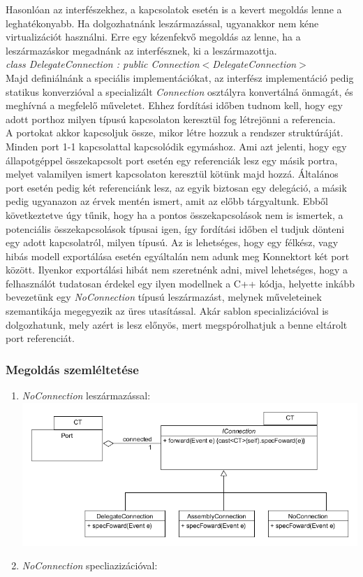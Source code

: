 \documentclass[a4paper,12pt]{report}
\begin{document}
Hasonlóan az interfészekhez, a kapcsolatok esetén is a kevert megoldás lenne a leghatékonyabb. Ha dolgozhatnánk leszármazással, ugyanakkor nem kéne virtualizációt használni. Erre egy kézenfekvő megoldás az lenne, ha a leszármazáskor megadnánk az interfésznek, ki a leszármazottja. \\
\textit{class DelegateConnection : public Connection}$<$\textit{DelegateConnection}$>$ \\
Majd definiálnánk a speciális implementációkat, az interfész implementáció pedig statikus konverzióval a specializált \textit{Connection} osztályra konvertálná önmagát, és meghívná a megfelelő műveletet. Ehhez fordítási időben tudnom kell, hogy egy adott porthoz milyen típusú kapcsolaton keresztül fog létrejönni a referencia. \\ 
A portokat akkor kapcsoljuk össze, mikor létre hozzuk a rendszer struktúráját. Minden port 1-1 kapcsolattal kapcsolódik egymáshoz. Ami azt jelenti, hogy egy állapotgéppel összekapcsolt port esetén egy referenciák lesz egy másik portra, melyet valamilyen ismert kapcsolaton keresztül kötünk majd hozzá. Általános port esetén pedig két referenciánk lesz, az egyik biztosan egy delegáció, a másik pedig ugyanazon az érvek mentén ismert, amit az előbb tárgyaltunk. Ebből következtetve úgy tűnik, hogy ha a pontos összekapcsolások nem is ismertek, a potenciális összekapcsolások típusai igen, így fordítási időben el tudjuk dönteni egy adott kapcsolatról, milyen típusú. Az is lehetséges, hogy egy félkész, vagy hibás modell exportálása esetén egyáltalán nem adunk meg Konnektort két port között. Ilyenkor exportálási hibát nem szeretnénk adni, mivel lehetséges, hogy a felhasználót tudatosan érdekel egy ilyen modellnek a C++ kódja, helyette inkább bevezetünk egy \textit{NoConnection} típusú leszármazást, melynek műveleteinek szemantikája megegyezik az üres utasítással. Akár sablon specializációval is dolgozhatunk, mely azért is lesz előnyös, mert megspórolhatjuk a benne eltárolt port referenciát.

\subsubsection{Megoldás szemléltetése}
\begin{enumerate}
\item \textit{NoConnection} leszármazással: \\
\includegraphics[scale=0.6]{extended_connection.png}
\item \textit{NoConnection} specliazizációval: \\

\end{enumerate}
\end{document}
